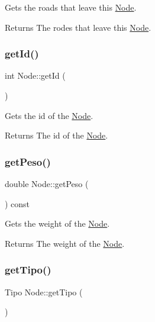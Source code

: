 Gets the roads that leave this \mbox{\hyperlink{class_node}{Node}}. 

\begin{DoxyReturn}{Returns}
The rodes that leave this \mbox{\hyperlink{class_node}{Node}}. 
\end{DoxyReturn}
\mbox{\label{class_node_a3c7b8ccf4dab44216b997c5f63f11d9f}} 
\subsubsection{\texorpdfstring{getId()}{getId()}}
{\footnotesize\ttfamily int Node\+::get\+Id (\begin{DoxyParamCaption}{ }\end{DoxyParamCaption})}



Gets the id of the \mbox{\hyperlink{class_node}{Node}}. 

\begin{DoxyReturn}{Returns}
The id of the \mbox{\hyperlink{class_node}{Node}}. 
\end{DoxyReturn}
\mbox{\label{class_node_a5999ff5a455f3c4ad55712ffee832ee3}} 
\subsubsection{\texorpdfstring{getPeso()}{getPeso()}}
{\footnotesize\ttfamily double Node\+::get\+Peso (\begin{DoxyParamCaption}{ }\end{DoxyParamCaption}) const}



Gets the weight of the \mbox{\hyperlink{class_node}{Node}}. 

\begin{DoxyReturn}{Returns}
The weight of the \mbox{\hyperlink{class_node}{Node}}. 
\end{DoxyReturn}
\mbox{\label{class_node_a6ef1b0b19699e0b03c024121f8d5a340}} 
\subsubsection{\texorpdfstring{getTipo()}{getTipo()}}
{\footnotesize\ttfamily Tipo Node\+::get\+Tipo (\begin{DoxyParamCaption}{ }\end{DoxyParamCaption})}



